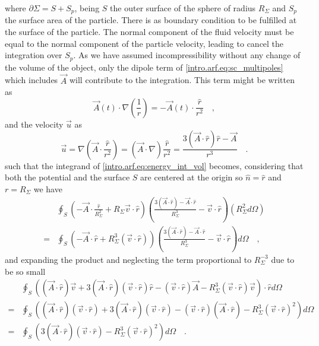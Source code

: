 where $\partial\Sigma = S + S_p$, being $S$ the outer surface of the sphere of radius $R_\Sigma$ and $S_p$ the surface area of the particle. There is as boundary condition to be fulfilled at the surface of the particle. The normal component of the fluid velocity must be equal to the normal component of the particle velocity, leading to cancel the integration over $S_p$. As we have assumed incompressibility without any change of the volume of the object, only the dipole term of \eqref{intro.arf.eq:sc_multipoles} which includes $\vec A$ will contribute to the integration. This term might be written as
\begin{equation}\label{intro.arf.eq:phi_dipole}
    \vec A(t) \cdot \nabla\left(\frac{1}{r}\right) = -\vec A(t) \cdot \frac{\hat r}{r^2}\quad,
\end{equation}
and the velocity $\vec u$ as
\begin{equation}\label{intro.arf.eq:grad_phi_dipole}
    \vec u = \nabla\left(\vec A \cdot \frac{\hat r}{r^2}\right) = (\vec A \cdot \nabla)\frac{\hat r}{r^2} = \frac{3(\vec A\cdot\hat r)\hat r - \vec A}{r^3}\quad.
\end{equation}
such that the integrand of \eqref{intro.arf.eq:energy_int_vol} becomes, considering that both the potential and the surface $S$ are centered at the origin so $\hat n = \hat r$ and $r = R_\Sigma$ we have
\begin{align}
    &\oint_{S} \left(-\vec A\cdot \frac{\hat r}{R_\Sigma^2} + R_\Sigma\vec v\cdot\hat r\right)\left(\frac{3(\vec A\cdot\hat r) - \vec A\cdot\hat r}{R_\Sigma^3} - \vec v\cdot\hat r\right) (R_\Sigma^2d\Omega) \nonumber\\
    =&\oint_{S} \left(-\vec A\cdot\hat r + R_\Sigma^3(\vec v\cdot\hat r)\right)\left(\frac{3(\vec A\cdot\hat r) - \vec A\cdot\hat r}{R_\Sigma^3} - \vec v\cdot\hat r\right) d\Omega\quad,
\end{align}
and expanding the product and neglecting the term proportional to $R_\Sigma^{-3}$ due to be so small
\begin{align}
    &\oint_{S} \left((\vec A\cdot\hat r)\vec v + 3(\vec A\cdot\hat r)(\vec v\cdot\hat r)\hat r - (\vec v\cdot\hat r)\vec A - R_\Sigma^3(\vec v\cdot\hat r)\vec v\right)\cdot\hat r d\Omega\nonumber\\
    =&\oint_{S} \left((\vec A\cdot\hat r)(\vec v\cdot\hat r) + 3(\vec A\cdot\hat r)(\vec v\cdot\hat r) - (\vec v\cdot\hat r)(\vec A\cdot\hat r) - R_\Sigma^3(\vec v\cdot\hat r)^2\right)d\Omega\nonumber\\
    =&\oint_{S} \left(3(\vec A\cdot\hat r)(\vec v\cdot\hat r) - R_\Sigma^3(\vec v\cdot\hat r)^2\right)d\Omega\quad.
\end{align}
